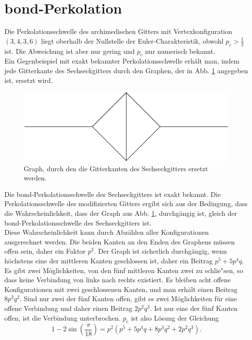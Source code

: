 \section{bond-Perkolation}
Die Perkolationsschwelle des archimedischen Gitters mit Vertexkonfiguration $(3,4,3,6)$ liegt oberhalb der Nullstelle der Euler-Charakteristik, obwohl $p_c>\frac{1}{2}$ ist. Die Abweichung ist aber nur gering und $p_c$ nur numerisch bekannt.\\
Ein Gegenbeispiel mit exakt bekannter Perkolationsschwelle erh\"alt man, indem jede Gitterkante des Sechseckgitters durch den Graphen, der in Abb. \ref{fig:hexbond} angegeben ist, ersetzt wird.
\begin{figure}[htbp]
  \centering
  \includegraphics{./Grenzen-Figs/figure}
  \caption{Graph, durch den die Gitterkanten des Sechseckgitters ersetzt werden.}
  \label{fig:hexbond}
\end{figure}
Die bond-Perkolationsschwelle des Sechseckgitters ist exakt bekannt. Die Perkolationsschwelle des modifizierten Gitters ergibt sich aus der Bedingung, dass die Wahrscheinlichkeit, dass der Graph aus Abb. \ref{fig:hexbond}, durchg\"angig ist, gleich der bond-Perkolationsschwelle des Sechseckgitters ist.\\
Diese Wahrscheinlichkeit kann durch Abz\"ahlen aller Konfigurationen ausgerechnet werden. Die beiden Kanten an den Enden des Graphens m\"ussen offen sein, daher ein Faktor $p^2$. Der Graph ist sicherlich durchg\"angig, wenn h\"ochstens eine der mittleren Kanten geschlossen ist, daher ein Beitrag $p^5+5p^4q$. Es gibt zwei M\"oglichkeiten, von den f\"unf mittleren Kanten zwei zu schlie"sen, so dass keine Verbindung von links nach rechts existiert. Es bleiben acht offene Konfigurationen mit zwei geschlossenen Kanten, und man erh\"alt einen Beitrag $8p^3q^2$. Sind nur zwei der f\"unf Kanten offen, gibt es zwei M\"oglichkeiten f\"ur eine offene Verbindung und daher einen Beitrag $2p^2q^3$. Ist nur eine der f\"unf Kanten offen, ist die Verbindung unterbrochen. $p_c$ ist also L\"osung der Gleichung
\begin{equation}
  1-2\sin\left(\frac{\pi}{18}\right) =p^2(p^5+5p^4q+8p^3q^2+2p^2q^3).
\end{equation}
